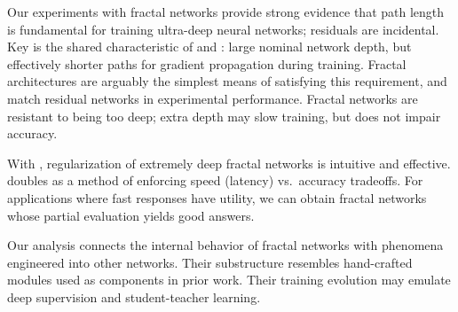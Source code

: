 Our experiments with fractal networks provide strong evidence that path length
is fundamental for training ultra-deep neural networks; residuals are
incidental.  Key is the shared characteristic of {\fracnet} and {\resnet}:
large nominal network depth, but effectively shorter paths for gradient
propagation during training.  Fractal architectures are arguably the simplest
means of satisfying this requirement, and match residual networks
in experimental performance.  Fractal networks are resistant to being too deep;
extra depth may slow training, but does not impair accuracy.

With {\droppath}, regularization of extremely deep fractal networks is
intuitive and effective.  {\Droppath} doubles as a method of enforcing speed
(latency) vs.~accuracy tradeoffs.  For applications where fast responses have
utility, we can obtain fractal networks whose partial evaluation yields good
answers.

Our analysis connects the internal behavior of fractal networks with phenomena
engineered into other networks.  Their substructure resembles hand-crafted
modules used as components in prior work.  Their training evolution may emulate
deep supervision and student-teacher learning.
